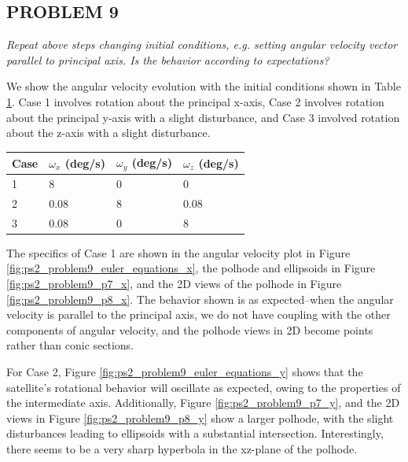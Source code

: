 \subsection{PROBLEM 9}
\textit{Repeat above steps changing initial conditions, e.g. setting angular velocity vector parallel to principal axis. Is the behavior according to expectations?}

We show the angular velocity evolution with the initial conditions shown in Table \ref{tab:ps2_problem9_conditions}. Case 1 involves rotation about the principal x-axis, Case 2 involves rotation about the principal y-axis with a slight disturbance, and Case 3 involved rotation about the z-axis with a slight disturbance.

\begin{table}[H]
\centering
\label{tab:ps2_problem9_conditions}
\begin{tabular}{|l|l|l|l|}
\hline
\textbf{Case} & \textbf{$\omega_x$ (deg/s)} & \textbf{$\omega_y$ (deg/s)} & \textbf{$\omega_z$ (deg/s)} \\ \hline
1             & 8                     & 0                     & 0                     \\ \hline
2             & 0.08                  & 8                     & 0.08                  \\ \hline
3             & 0.08                  & 0                     & 8                     \\ \hline
\end{tabular}
\end{table}

The specifics of Case 1 are shown in the angular velocity plot in Figure \ref{fig:ps2_problem9_euler_equations_x}, the polhode and ellipsoids in Figure \ref{fig:ps2_problem9_p7_x}, and the 2D views of the polhode in Figure \ref{fig:ps2_problem9_p8_x}. The behavior shown is as expected–when the angular velocity is parallel to the principal axis, we do not have coupling with the other components of angular velocity, and the polhode views in 2D become points rather than conic sections.

For Case 2, Figure \ref{fig:ps2_problem9_euler_equations_y} shows that the satellite's rotational behavior will oscillate as expected, owing to the properties of the intermediate axis. Additionally, Figure \ref{fig:ps2_problem9_p7_y}, and the 2D views in Figure \ref{fig:ps2_problem9_p8_y} show a larger polhode, with the slight disturbances leading to ellipsoids with a substantial intersection. Interestingly, there seems to be a very sharp hyperbola in the xz-plane of the polhode.


